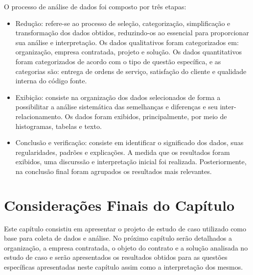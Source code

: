 O processo de análise de dados foi composto por três etapas:
\begin{itemize}
\item Redução: refere-se ao processo de seleção, categorização, simplificação e transformação dos dados obtidos, reduzindo-os ao essencial para proporcionar sua análise e interpretação. Os dados qualitativos foram categorizados em: organização, empresa contratada, projeto e solução. Os dados quantitativos foram categorizados de acordo com o tipo de questão específica, e as categorias são: entrega de ordens de serviço, satisfação do cliente e qualidade interna do código fonte.
\item Exibição: consiste na organização dos dados selecionados de forma a possibilitar a análise sistemática das semelhanças e diferenças e seu inter-relacionamento. Os dados foram exibidos, principalmente, por meio de histogramas, tabelas e texto.
\item Conclusão e verificação: consiste em identificar o significado dos dados, suas regularidades, padrões e explicações. A medida que os resultados foram exibidos, uma discurssão e interpretação inicial foi realizada. Posteriormente, na conclusão final foram agrupados os resultados mais relevantes.
\end{itemize}


\section[Considerações Finais do Capítulo]{Considerações Finais do Capítulo}

Este capítulo consistiu em apresentar o projeto de estudo de caso utilizado como base para coleta de dados e análise. No próximo capítulo serão detalhados a organização, a empresa contratada, o objeto do contrato e a solução analisada no estudo de caso e serão apresentados os resultados obtidos para as questões específicas apresentadas neste capítulo assim como a interpretação dos mesmos.